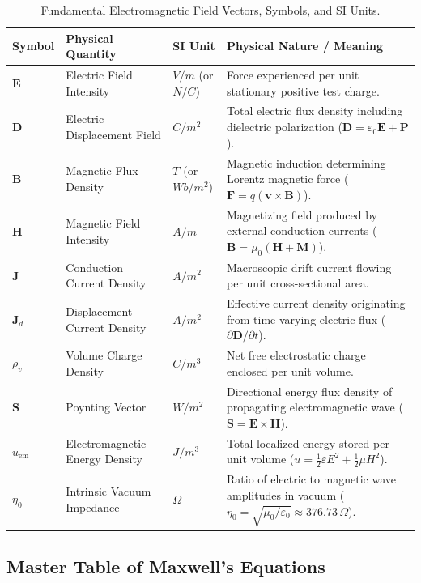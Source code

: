 \begin{table}[htbp]
\centering
\small
\renewcommand{\arraystretch}{1.25}
\begin{tabularx}{\linewidth}{lllX}
\toprule
\textbf{Symbol} & \textbf{Physical Quantity} & \textbf{SI Unit} & \textbf{Physical Nature / Meaning} \\
\midrule
$\mathbf{E}$ & Electric Field Intensity & $\si{V/m}$ (or $\si{N/C}$) & Force experienced per unit stationary positive test charge. \\
$\mathbf{D}$ & Electric Displacement Field & $\si{C/m^2}$ & Total electric flux density including dielectric polarization ($\mathbf{D} = \varepsilon_0 \mathbf{E} + \mathbf{P}$). \\
$\mathbf{B}$ & Magnetic Flux Density & $\si{T}$ (or $\si{Wb/m^2}$) & Magnetic induction determining Lorentz magnetic force ($\mathbf{F} = q(\mathbf{v} \times \mathbf{B})$). \\
$\mathbf{H}$ & Magnetic Field Intensity & $\si{A/m}$ & Magnetizing field produced by external conduction currents ($\mathbf{B} = \mu_0(\mathbf{H} + \mathbf{M})$). \\
$\mathbf{J}$ & Conduction Current Density & $\si{A/m^2}$ & Macroscopic drift current flowing per unit cross-sectional area. \\
$\mathbf{J}_d$ & Displacement Current Density & $\si{A/m^2}$ & Effective current density originating from time-varying electric flux ($\partial \mathbf{D}/\partial t$). \\
$\rho_v$ & Volume Charge Density & $\si{C/m^3}$ & Net free electrostatic charge enclosed per unit volume. \\
$\mathbf{S}$ & Poynting Vector & $\si{W/m^2}$ & Directional energy flux density of propagating electromagnetic wave ($\mathbf{S} = \mathbf{E} \times \mathbf{H}$). \\
$u_{\text{em}}$ & Electromagnetic Energy Density & $\si{J/m^3}$ & Total localized energy stored per unit volume ($u = \frac{1}{2}\varepsilon E^2 + \frac{1}{2}\mu H^2$). \\
$\eta_0$ & Intrinsic Vacuum Impedance & $\si{\Omega}$ & Ratio of electric to magnetic wave amplitudes in vacuum ($\eta_0 = \sqrt{\mu_0/\varepsilon_0} \approx 376.73\,\Omega$). \\
\bottomrule
\end{tabularx}
\caption{Fundamental Electromagnetic Field Vectors, Symbols, and SI Units.}
\label{tab:em-symbols-units}
\end{table}

\subsection{Master Table of Maxwell's Equations}


